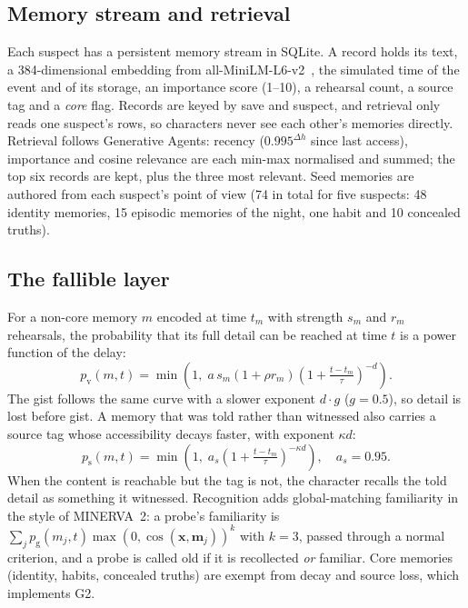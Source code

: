 \documentclass[conference]{IEEEtran}
\begin{document}
\subsection{Memory stream and retrieval}
Each suspect has a persistent memory stream in SQLite. A record holds its text, a 384-dimensional
embedding from all-MiniLM-L6-v2~\cite{reimers2019sbert,wang2020minilm}, the simulated time of the
event and of its storage, an importance score (1--10), a rehearsal count, a source tag and a
\emph{core} flag. Records are keyed by save and suspect, and retrieval only reads one suspect's rows,
so characters never see each other's memories directly. Retrieval follows Generative Agents: recency
($0.995^{\Delta h}$ since last access), importance and cosine relevance are each min-max normalised and
summed; the top six records are kept, plus the three most relevant. Seed memories are authored from
each suspect's point of view (74 in total for five suspects: 48 identity memories, 15 episodic memories
of the night, one habit and 10 concealed truths).

\subsection{The fallible layer}
\label{sec:fallible}
For a non-core memory $m$ encoded at time $t_m$ with strength $s_m$ and $r_m$ rehearsals, the
probability that its full detail can be reached at time $t$ is a power function of the delay:
\begin{equation}
p_{\mathrm{v}}(m,t) = \min\!\left(1,\; a\, s_m (1+\rho r_m) \left(1 + \tfrac{t-t_m}{\tau}\right)^{-d}\right).
\end{equation}
The gist follows the same curve with a slower exponent $d \cdot g$ ($g = 0.5$), so detail is lost
before gist. A memory that was told rather than witnessed also carries a source tag whose
accessibility decays faster, with exponent $\kappa d$:
\begin{equation}
p_{\mathrm{s}}(m,t) = \min\!\left(1,\; a_s \left(1 + \tfrac{t-t_m}{\tau}\right)^{-\kappa d}\right),\quad a_s = 0.95.
\end{equation}
When the content is reachable but the tag is not, the character recalls the told detail as something
it witnessed. Recognition adds global-matching familiarity in the style of MINERVA~2: a probe's
familiarity is $\sum_j p_{\mathrm{g}}(m_j,t)\max(0,\cos(\mathbf{x}, \mathbf{m}_j))^{k}$ with $k = 3$,
passed through a normal criterion, and a probe is called old if it is recollected \emph{or} familiar.
Core memories (identity, habits, concealed truths) are exempt from decay and source loss, which
implements G2.
\end{document}
